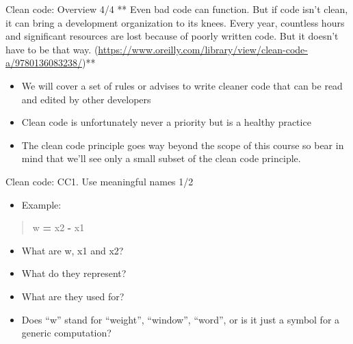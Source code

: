 \documentclass[
  8pt,
  ignorenonframetext,
]{beamer}
\newenvironment{Shaded}{\begin{snugshade}}{\end{snugshade}}
\newcommand{\NormalTok}[1]{#1}
\newcommand{\OperatorTok}[1]{\textcolor[rgb]{0.81,0.36,0.00}{\textbf{#1}}}
\providecommand{\tightlist}{%
  \setlength{\itemsep}{0pt}\setlength{\parskip}{0pt}}
\begin{document}
\begin{frame}{Clean code: Overview 4/4}
\protect\hypertarget{clean-code-overview-44}{}
** Even bad code can function. But if code isn't clean, it can bring a
development organization to its knees. Every year, countless hours and
significant resources are lost because of poorly written code. But it
doesn't have to be that way.
(\url{https://www.oreilly.com/library/view/clean-code-a/9780136083238/})**

\begin{itemize}
\item
  We will cover a set of rules or advises to write cleaner code that can
  be read and edited by other developers
\item
  Clean code is unfortunately never a priority but is a healthy practice
\item
  The clean code principle goes way beyond the scope of this course so
  bear in mind that we'll see only a small subset of the clean code
  principle.
\end{itemize}
\end{frame}

\begin{frame}[fragile]{Clean code: CC1. Use meaningful names 1/2}
\protect\hypertarget{clean-code-cc1.-use-meaningful-names-12}{}
\begin{itemize}[<+->]
\tightlist
\item
  Example:
\end{itemize}

\begin{quote}
\begin{Shaded}
\begin{Highlighting}[]
\NormalTok{w }\OperatorTok{=}\NormalTok{ x2 }\OperatorTok{{-}}\NormalTok{ x1}
\end{Highlighting}
\end{Shaded}
\end{quote}

\begin{itemize}[<+->]
\tightlist
\item
  What are w, x1 and x2?
\end{itemize}

\begin{itemize}[<+->]
\tightlist
\item
  What do they represent?
\item
  What are they used for?
\end{itemize}

\begin{itemize}[<+->]
\tightlist
\item
  Does ``w'' stand for ``weight'', ``window'', ``word'', or is it just a
  symbol for a generic computation?
\end{itemize}
\end{frame}
\end{document}
